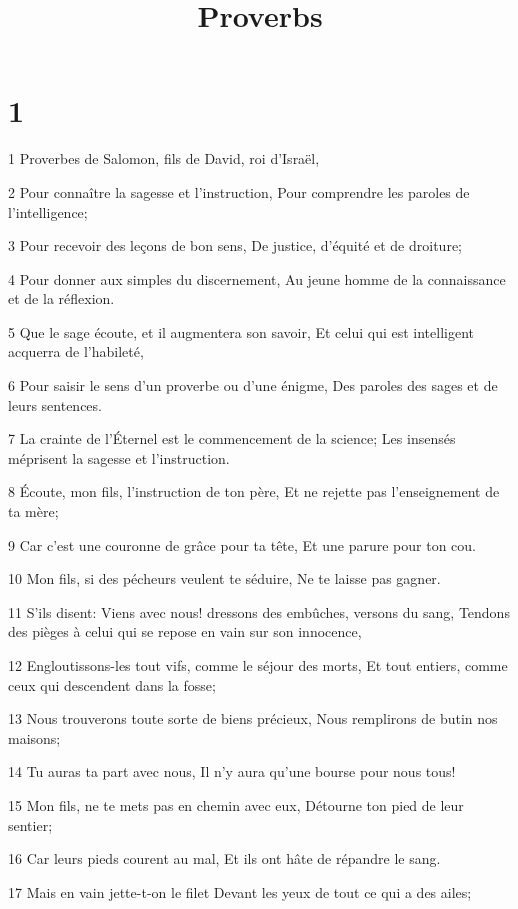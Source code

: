 

\title{Proverbs}


\chapter{1}

\par 1 Proverbes de Salomon, fils de David, roi d'Israël,
\par 2 Pour connaître la sagesse et l'instruction, Pour comprendre les paroles de l'intelligence;
\par 3 Pour recevoir des leçons de bon sens, De justice, d'équité et de droiture;
\par 4 Pour donner aux simples du discernement, Au jeune homme de la connaissance et de la réflexion.
\par 5 Que le sage écoute, et il augmentera son savoir, Et celui qui est intelligent acquerra de l'habileté,
\par 6 Pour saisir le sens d'un proverbe ou d'une énigme, Des paroles des sages et de leurs sentences.
\par 7 La crainte de l'Éternel est le commencement de la science; Les insensés méprisent la sagesse et l'instruction.
\par 8 Écoute, mon fils, l'instruction de ton père, Et ne rejette pas l'enseignement de ta mère;
\par 9 Car c'est une couronne de grâce pour ta tête, Et une parure pour ton cou.
\par 10 Mon fils, si des pécheurs veulent te séduire, Ne te laisse pas gagner.
\par 11 S'ils disent: Viens avec nous! dressons des embûches, versons du sang, Tendons des pièges à celui qui se repose en vain sur son innocence,
\par 12 Engloutissons-les tout vifs, comme le séjour des morts, Et tout entiers, comme ceux qui descendent dans la fosse;
\par 13 Nous trouverons toute sorte de biens précieux, Nous remplirons de butin nos maisons;
\par 14 Tu auras ta part avec nous, Il n'y aura qu'une bourse pour nous tous!
\par 15 Mon fils, ne te mets pas en chemin avec eux, Détourne ton pied de leur sentier;
\par 16 Car leurs pieds courent au mal, Et ils ont hâte de répandre le sang.
\par 17 Mais en vain jette-t-on le filet Devant les yeux de tout ce qui a des ailes;
